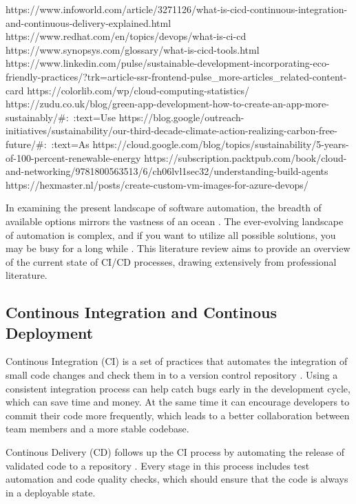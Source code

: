 https://www.infoworld.com/article/3271126/what-is-cicd-continuous-integration-and-continuous-delivery-explained.html
https://www.redhat.com/en/topics/devops/what-is-ci-cd
https://www.synopsys.com/glossary/what-is-cicd-tools.html
https://www.linkedin.com/pulse/sustainable-development-incorporating-eco-friendly-practices/?trk=article-ssr-frontend-pulse_more-articles_related-content-card
https://colorlib.com/wp/cloud-computing-statistics/
https://zudu.co.uk/blog/green-app-development-how-to-create-an-app-more-sustainably/#:~:text=Use%
https://blog.google/outreach-initiatives/sustainability/our-third-decade-climate-action-realizing-carbon-free-future/#:~:text=As%
https://cloud.google.com/blog/topics/sustainability/5-years-of-100-percent-renewable-energy
https://subscription.packtpub.com/book/cloud-and-networking/9781800563513/6/ch06lvl1sec32/understanding-build-agents
https://hexmaster.nl/posts/create-custom-vm-images-for-azure-devops/


In examining the present landscape of software automation, the breadth of available options mirrors the vastness of an ocean \autocite{King2019}.
The ever-evolving landscape of automation is complex, and if you want to utilize all possible solutions, you may be busy for a long while \autocite{King2019}.
This literature review aims to provide an overview of the current state of CI/CD processes, drawing extensively from professional literature.

\subsection{Continous Integration and Continous Deployment}
Continous Integration (CI) is a set of practices that automates the integration of small code changes and check them in to a version control repository \autocite{infoworld}.
Using a consistent integration process can help catch bugs early in the development cycle, which can save time and money. 
At the same time it can encourage developers to commit their code more frequently, which leads to a better collaboration between team members and a more stable codebase.

Continous Delivery (CD) follows up the CI process by automating the release of validated code to a repository \autocite{redhat}.
Every stage in this process includes test automation and code quality checks, which should ensure that the code is always in a deployable state.

